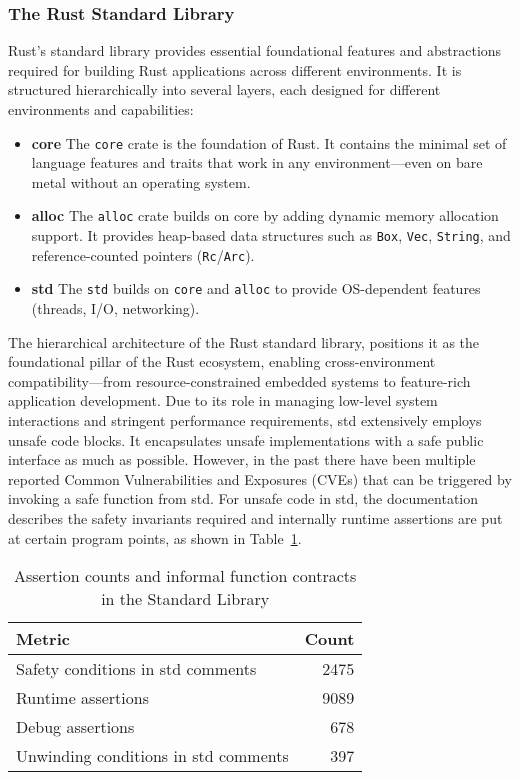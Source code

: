 \documentclass[conference]{IEEEtran}
\begin{document}
\subsubsection{The Rust Standard Library}
Rust's standard library provides essential foundational features and abstractions required for building Rust applications across different environments. It is structured hierarchically into several layers, each designed for different environments and capabilities:
\begin{itemize}
        \item \textbf{core} The \texttt{core} crate is the foundation of Rust. It contains the minimal set of language features and traits that work in any environment—even on bare metal without an operating system.
        \item \textbf{alloc} The \texttt{alloc} crate builds on core by adding dynamic memory allocation support. It provides heap-based data structures such as \texttt{Box}, \texttt{Vec}, \texttt{String}, and reference-counted pointers (\texttt{Rc}/\texttt{Arc}).
        \item \textbf{std} The \texttt{std} builds on \texttt{core} and \texttt{alloc} to provide OS-dependent features (threads, I/O, networking).
\end{itemize}

The hierarchical architecture of the Rust standard library, positions it as the foundational pillar of the Rust ecosystem, enabling cross-environment compatibility—from resource-constrained embedded systems to feature-rich application development. Due to its role in managing low-level system interactions and stringent performance requirements, std extensively employs unsafe code blocks. It encapsulates unsafe implementations with a safe public interface as much as possible. However, in the past there have been multiple reported Common Vulnerabilities and Exposures (CVEs)\cite{Qwaz_rust-cve} that can be triggered by invoking a safe function from std. For unsafe code in std, the documentation describes the safety invariants required and internally runtime assertions are put at certain program points, as shown in Table~\ref{tab:assertion_counts}.   

\begin{table}[htbp]
\centering
\begin{tabular}{l r}
\toprule
\textbf{Metric} & \textbf{Count} \\
\midrule
Safety conditions in std comments & 2475 \\
Runtime assertions & 9089 \\
Debug assertions & 678 \\
Unwinding conditions in std comments & 397 \\
\bottomrule
\end{tabular}
\caption{Assertion counts and informal function contracts in the Standard Library}
\label{tab:assertion_counts}
\end{table}
\end{document}
